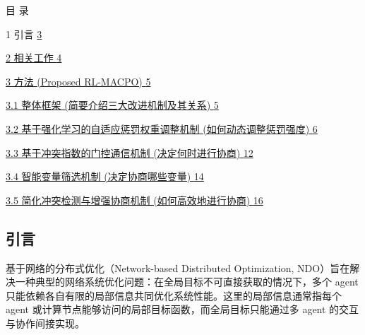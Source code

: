 \documentclass[12pt]{ctexart}
\author{}
\date{}
\begin{document}
目 录

1 引言 \hyperref[ux5f15ux8a00]{3}

\hyperref[ux76f8ux5173ux5de5ux4f5c]{2 相关工作
\hyperref[ux76f8ux5173ux5de5ux4f5c]{4}}

\hyperref[ux65b9ux6cd5-proposed-rl-macpo]{3 方法 (Proposed RL-MACPO)
\hyperref[ux65b9ux6cd5-proposed-rl-macpo]{5}}

\hyperref[ux6574ux4f53ux6846ux67b6-ux7b80ux8981ux4ecbux7ecdux4e09ux5927ux6539ux8fdbux673aux5236ux53caux5176ux5173ux7cfb]{3.1
整体框架 (简要介绍三大改进机制及其关系)
\hyperref[ux6574ux4f53ux6846ux67b6-ux7b80ux8981ux4ecbux7ecdux4e09ux5927ux6539ux8fdbux673aux5236ux53caux5176ux5173ux7cfb]{5}}

\hyperref[ux57faux4e8eux5f3aux5316ux5b66ux4e60ux7684ux81eaux9002ux5e94ux60e9ux7f5aux6743ux91cdux8c03ux6574ux673aux5236-ux5982ux4f55ux52a8ux6001ux8c03ux6574ux60e9ux7f5aux5f3aux5ea6]{3.2
基于强化学习的自适应惩罚权重调整机制 (如何动态调整惩罚强度)
\hyperref[ux57faux4e8eux5f3aux5316ux5b66ux4e60ux7684ux81eaux9002ux5e94ux60e9ux7f5aux6743ux91cdux8c03ux6574ux673aux5236-ux5982ux4f55ux52a8ux6001ux8c03ux6574ux60e9ux7f5aux5f3aux5ea6]{6}}

\hyperref[ux57faux4e8eux51b2ux7a81ux6307ux6570ux7684ux95e8ux63a7ux901aux4fe1ux673aux5236-ux51b3ux5b9aux4f55ux65f6ux8fdbux884cux534fux5546]{3.3
基于冲突指数的门控通信机制 (决定何时进行协商)
\hyperref[ux57faux4e8eux51b2ux7a81ux6307ux6570ux7684ux95e8ux63a7ux901aux4fe1ux673aux5236-ux51b3ux5b9aux4f55ux65f6ux8fdbux884cux534fux5546]{12}}

\hyperref[ux667aux80fdux53d8ux91cfux7b5bux9009ux673aux5236-ux51b3ux5b9aux534fux5546ux54eaux4e9bux53d8ux91cf]{3.4
智能变量筛选机制 (决定协商哪些变量)
\hyperref[ux667aux80fdux53d8ux91cfux7b5bux9009ux673aux5236-ux51b3ux5b9aux534fux5546ux54eaux4e9bux53d8ux91cf]{14}}

\hyperref[ux7b80ux5316ux51b2ux7a81ux68c0ux6d4bux4e0eux589eux5f3aux534fux5546ux673aux5236-ux5982ux4f55ux9ad8ux6548ux5730ux8fdbux884cux534fux5546]{3.5
简化冲突检测与增强协商机制 (如何高效地进行协商)
\hyperref[ux7b80ux5316ux51b2ux7a81ux68c0ux6d4bux4e0eux589eux5f3aux534fux5546ux673aux5236-ux5982ux4f55ux9ad8ux6548ux5730ux8fdbux884cux534fux5546]{16}}

\textbf{\hfill\break
}

\subsection{引言}\label{ux5f15ux8a00}

基于网络的分布式优化（Network-based Distributed Optimization,
NDO）旨在解决一种典型的网络系统优化问题：在全局目标不可直接获取的情况下，多个
agent
只能依赖各自有限的局部信息共同优化系统性能。这里的局部信息通常指每个
agent 或计算节点能够访问的局部目标函数，而全局目标只能通过多 agent
的交互与协作间接实现。
\end{document}

